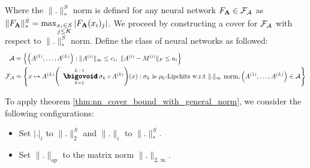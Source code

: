 \noindent Where the $\|.\|_*^S$ norm is defined for any neural network $F_{\bf A}\in\mathcal{F}_\mathcal{A}$ as $\|F_{\bf A}\|_*^S = \max_{\substack{x_i\in S \\ j \le K}} |F_{\bf A}(x_i)_j|$. We proceed by constructing a cover for $\mathcal{F}_\mathcal{A}$ with respect to $\|.\|_*^S$ norm. Define the class of neural networks as followed:
\begin{align*}
    \mathcal{A} &= \bigCurl{
        \bigRound{\A{1}, \dots, \A{L}} : \|\A{i}\|_\infty \le c_i, \ \|\A{i} - \M{i}\|_F \le a_i
    }\\
    \F_\mathcal{A} &= \biggCurl{
        x \mapsto \A{L}\biggRound{
            \bigO_{k=1}^{L-1}\sigma_k\circ \A{k} 
        }(x) : \sigma_k \text{ is $\rho_k$-Lipchitz w.r.t $\|.\|_\infty$ norm}, \bigRound{\A{1}, \dots, \A{L}}\in\mathcal{A}
    }
\end{align*} 


\noindent To apply theorem \ref{thm:nn_cover_bound_with_general_norm}, we consider the following configurations:
\begin{itemize}
    \item Set $|.|_i$ to $\|.\|_2^S$ and $\|.\|_i$ to $\|.\|_*^S$.
    \item Set $\|.\|_{op}$ to the matrix norm $\|.\|_{2, \infty}$.
\end{itemize}

